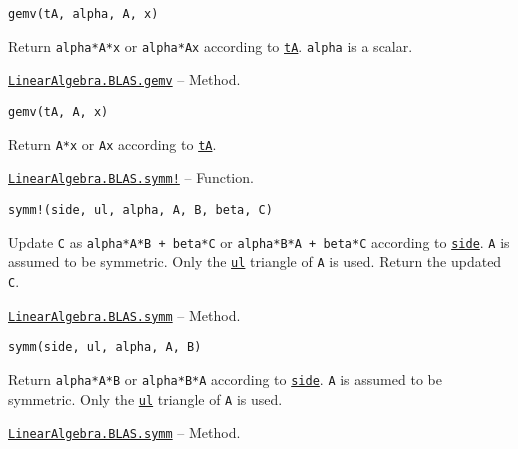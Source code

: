 \begin{adjustwidth}{2em}{0pt}


\begin{verbatim}
gemv(tA, alpha, A, x)
\end{verbatim}

Return \texttt{alpha*A*x} or \texttt{alpha*A{\textquotesingle}x} according to \hyperlink{15951037910221396131}{\texttt{tA}}. \texttt{alpha} is a scalar.



\end{adjustwidth}
\hypertarget{10250669589948467576}{} 
\hyperlink{10250669589948467576}{\texttt{LinearAlgebra.BLAS.gemv}}  -- {Method.}

\begin{adjustwidth}{2em}{0pt}


\begin{verbatim}
gemv(tA, A, x)
\end{verbatim}

Return \texttt{A*x} or \texttt{A{\textquotesingle}x} according to \hyperlink{15951037910221396131}{\texttt{tA}}.



\end{adjustwidth}
\hypertarget{8132740051631912637}{} 
\hyperlink{8132740051631912637}{\texttt{LinearAlgebra.BLAS.symm!}}  -- {Function.}

\begin{adjustwidth}{2em}{0pt}


\begin{verbatim}
symm!(side, ul, alpha, A, B, beta, C)
\end{verbatim}

Update \texttt{C} as \texttt{alpha*A*B + beta*C} or \texttt{alpha*B*A + beta*C} according to \hyperlink{3128026147631247774}{\texttt{side}}. \texttt{A} is assumed to be symmetric. Only the \hyperlink{13880289478825450693}{\texttt{ul}} triangle of \texttt{A} is used. Return the updated \texttt{C}.



\end{adjustwidth}
\hypertarget{14160843903859790944}{} 
\hyperlink{14160843903859790944}{\texttt{LinearAlgebra.BLAS.symm}}  -- {Method.}

\begin{adjustwidth}{2em}{0pt}


\begin{verbatim}
symm(side, ul, alpha, A, B)
\end{verbatim}

Return \texttt{alpha*A*B} or \texttt{alpha*B*A} according to \hyperlink{3128026147631247774}{\texttt{side}}. \texttt{A} is assumed to be symmetric. Only the \hyperlink{13880289478825450693}{\texttt{ul}} triangle of \texttt{A} is used.



\end{adjustwidth}
\hypertarget{16069722670191405715}{} 
\hyperlink{16069722670191405715}{\texttt{LinearAlgebra.BLAS.symm}}  -- {Method.}

